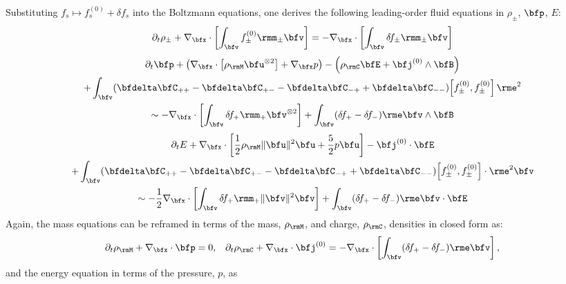     Substituting $f_{s}  \mapsto  f_{s}^{(0)} + \delta\! f_{s}$ into the Boltzmann equations, one derives the following leading-order fluid equations in $\rho_{\pm}$, $\bfp$, $E$:
    \begin{equation}
        \partial_{t}\rho_{\pm} + \nabla_{\bfx}\cdot\left[\int_{\bfv}f_{\pm}^{(0)}\rmm_{\pm}\bfv\right]  =  - \nabla_{\bfx}\cdot\left[\int_{\bfv}\delta\! f_{\pm}\rmm_{\pm}\bfv\right]
    \end{equation}
    \vspace{-20pt}
    \begin{multline}
        \partial_{t}\bfp + \left(\nabla_{\bfx}\cdot\left[\rho_{\rmM}\bfu^{\otimes 2}\right] + \nabla_{\bfx}p\right) - \left(\rho_{\rmC}\bfE + \bfj^{(0)}\wedge\bfB\right) \\
        + \int_{\bfv}(\bfdelta\bfC_{++} - \bfdelta\bfC_{+-} - \bfdelta\bfC_{-+} + \bfdelta\bfC_{--})\!\left[f_{\pm}^{(0)}, f_{\pm}^{(0)}\right]\rme^{2}  \\
        \sim  - \nabla_{\bfx}\cdot\left[\int_{\bfv}\delta\! f_{+}\rmm_{+}\bfv^{\otimes 2}\right] + \int_{\bfv}(\delta\! f_{+} - \delta\! f_{-})\rme\bfv\wedge\bfB
    \end{multline}
    \vspace{-25pt}
    \begin{multline}
        \partial_{t}E + \nabla_{\bfx}\cdot\left[\frac{1}{2}\rho_{\rmM}\|\bfu\|^{2}\bfu + \frac{5}{2}p\bfu\right] - \bfj^{(0)}\cdot\bfE  \\
        + \int_{\bfv}(\bfdelta\bfC_{++} - \bfdelta\bfC_{+-} - \bfdelta\bfC_{-+} + \bfdelta\bfC_{--})\!\left[f_{\pm}^{(0)}, f_{\pm}^{(0)}\right]\cdot\rme^{2}\bfv  \\
        \sim  - \frac{1}{2}\nabla_{\bfx}\cdot\left[\int_{\bfv}\delta\! f_{+}\rmm_{+}\|\bfv\|^{2}\bfv\right] + \int_{\bfv}(\delta\! f_{+} - \delta\! f_{-})\rme\bfv\cdot\bfE
    \end{multline}
    Again, the mass equations can be reframed in terms of the mass, $\rho_{\rmM}$, and charge, $\rho_{\rmC}$, densities in closed form as:
    \begin{align}
        \partial_{t}\rho_{\rmM} + \nabla_{\bfx}\cdot\bfp  =  0,  &&
        \partial_{t}\rho_{\rmC} + \nabla_{\bfx}\cdot\bfj^{(0)}  =  - \nabla_{\bfx}\cdot\left[\int_{\bfv}(\delta\! f_{+} - \delta\! f_{-})\rme\bfv\right],
    \end{align}
    and the energy equation in terms of the pressure, $p$, as
